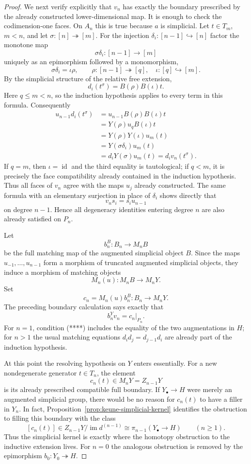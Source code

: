 \documentclass[10pt,a4paper]{amsart}
\newcommand{\id}{\operatorname{id}}
\begin{document}
\begin{proof}
We next verify explicitly that $v_n$ has exactly the boundary prescribed
by the already constructed lower-dimensional map.  It is enough to
check the codimension-one faces.  On $A_n$ this is true because $a$ is
simplicial.  Let $t\in T_m$, $m<n$, and let
$\sigma:[n]\twoheadrightarrow[m]$.  For the injection
$\delta_i:[n-1]\hookrightarrow[n]$ factor the monotone map
\[
 \sigma\delta_i:[n-1]\longrightarrow[m]
\]
uniquely as an epimorphism followed by a monomorphism,
\[
 \sigma\delta_i=\iota\rho,
 \qquad
 \rho:[n-1]\twoheadrightarrow[q],\quad
 \iota:[q]\hookrightarrow[m].             \tag{***}
\]
By the simplicial structure of the relative free extension,
\[
 d_i(t^\sigma)=B(\rho)B(\iota)t.
\]
Here $q\leq m<n$, so the induction hypothesis applies to every term in
this formula.  Consequently
\begin{align*}
 u_{n-1}d_i(t^\sigma)
 &=u_{n-1}B(\rho)B(\iota)t\\
 &=Y(\rho)u_qB(\iota)t\\
 &=Y(\rho)Y(\iota)u_m(t)\\
 &=Y(\sigma\delta_i)u_m(t)\\
 &=d_iY(\sigma)u_m(t)
  =d_iv_n(t^\sigma).
\end{align*}
If $q=m$, then $\iota=\id$ and the third equality is tautological; if
$q<m$, it is precisely the face compatibility already contained in the
induction hypothesis.  Thus all faces of $v_n$ agree with the maps
$u_j$ already constructed.  The same formula with an elementary
surjection in place of $\delta_i$ shows directly that
\[
 v_ns_i=s_iu_{n-1}
\]
on degree $n-1$.  Hence all degeneracy identities entering degree $n$
are also already satisfied on $P_n$.

Let
\[
 b_n^B:B_n\longrightarrow M_nB
\]
be the full matching map of the augmented simplicial object $B$.  Since
the maps $u_{-1},\ldots,u_{n-1}$ form a morphism of truncated augmented
simplicial objects, they induce a morphism of matching objects
\[
 M_n(u):M_nB\longrightarrow M_nY.
\]
Set
\[
 c_n=M_n(u)b_n^B:B_n\longrightarrow M_nY.
\]
The preceding boundary calculation says exactly that
\[
 b_n^Yv_n=c_n|_{P_n}.                       \tag{****}
\]
For $n=1$, condition (****) includes the equality of the two
augmentations in $H$; for $n>1$ the usual matching equations
$d_id_j=d_{j-1}d_i$ are already part of the induction hypothesis.

At this point the resolving hypothesis on $Y$ enters essentially.
For a new nondegenerate generator $t\in T_n$, the element
\[
 c_n(t)\in M_nY=Z_{n-1}Y
\]
is its already prescribed compatible full boundary. If $Y_\bullet\to H$
were merely an augmented simplicial group, there would be no reason for
$c_n(t)$ to have a filler in $Y_n$. In fact,
Proposition~\ref{prop:keune-simplicial-kernel} identifies the obstruction
to filling this boundary with the class
\[
 [c_n(t)]\in
 Z_{n-1}Y/\operatorname{im}d^{(n-1)}
 \cong \pi_{n-1}(Y_\bullet\to H)
 \qquad(n\geq1).
\]
Thus the simplicial kernel is exactly where the homotopy obstruction to
the inductive extension lives. For $n=0$ the analogous obstruction is
removed by the epimorphism $b_0:Y_0\twoheadrightarrow H$.


\end{proof}
\end{document}
